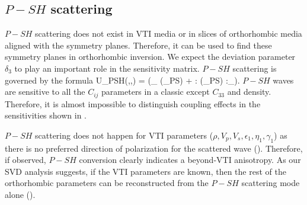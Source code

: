 \subsection{$P-SH$ scattering}
$P-SH$ scattering does not exist in VTI media or in slices of orthorhombic media aligned with the symmetry planes. Therefore, it can be used to find these symmetry planes in orthorhombic inversion. We expect the deviation parameter $\delta_3$ to play an important role in the sensitivity matrix.
$P-SH$ scattering is governed by the formula
\beq
\delta U_{PSH}(\sv,\gv,\omega) = (\sv\cdot\gv_{\phi} \delta \hat{\rho}(\Kv_{PS}) + \sv\sv : \delta \hat{\cv}(\Kv_{PS}) :\gv\gv_{\phi}).
\eeq
$P-SH$ waves are sensitive to all the $C_{ij}$ parameters in a classic \cpar except $C_{33}$ and density. Therefore, it is almost impossible to distinguish coupling effects in the sensitivities shown in .

$P-SH$ scattering does not happen for VTI parameters ($\rho,V_p,V_s,\epsilon_1,\eta_1,\gamma_1$) as there is no preferred direction of polarization for the scattered wave (). Therefore, if observed, $P-SH$ conversion clearly indicates a beyond-VTI anisotropy. As our SVD analysis suggests, if the VTI parameters are known, then the rest of the orthorhombic parameters can be reconstructed from the $P-SH$ scattering mode alone ().   



